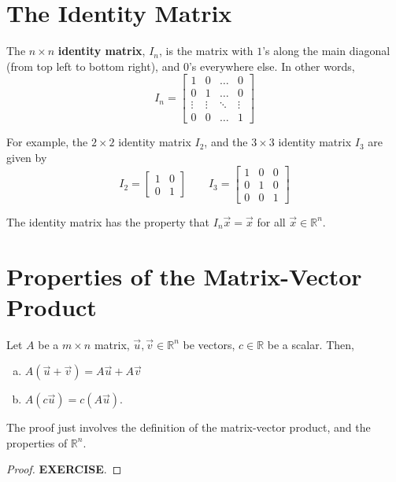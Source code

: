 \documentclass[letterpaper,12pt]{article}
\begin{document}
\section*{The Identity Matrix}
\begin{definition}
The $n \times n$ \textbf{identity matrix}, $I_n$, is the matrix with $1$'s along the main diagonal (from top left to bottom right), and $0$'s everywhere else. In other words,
\begin{equation*}
    I_n = \begin{bmatrix} 1 & 0 & \dots & 0 \\ 0 & 1 & \dots & 0 \\ \vdots & \vdots & \ddots & \vdots \\ 0 & 0 & \dots & 1 \end{bmatrix}
\end{equation*}
\end{definition}

For example, the $2 \times 2$ identity matrix $I_2$, and the $3 \times 3$ identity matrix $I_3$ are given by
\begin{equation*}
    I_2 = \begin{bmatrix} 1 & 0 \\ 0 & 1 \end{bmatrix} \qquad I_3 = \begin{bmatrix} 1 & 0 & 0 \\ 0 & 1 & 0 \\ 0 & 0 & 1 \end{bmatrix}
\end{equation*}

The identity matrix has the property that $I_n \vec{x} = \vec{x}$ for all $\vec{x} \in \mathbb{R}^n$.

\section*{Properties of the Matrix-Vector Product}
\begin{theorem}
Let $A$ be a $m \times n$ matrix, $\vec{u}, \vec{v} \in \mathbb{R}^n$ be vectors, $c \in \mathbb{R}$ be a scalar. Then,
\begin{enumerate}[(a)]
    \item $A(\vec{u} + \vec{v}) = A\vec{u} + A\vec{v}$
    \item $A(c\vec{u}) = c(A\vec{u})$.
\end{enumerate}
\end{theorem}

The proof just involves the definition of the matrix-vector product, and the properties of $\mathbb{R}^n$.

\begin{proof}
\textbf{EXERCISE}.
\end{proof}
\end{document}
